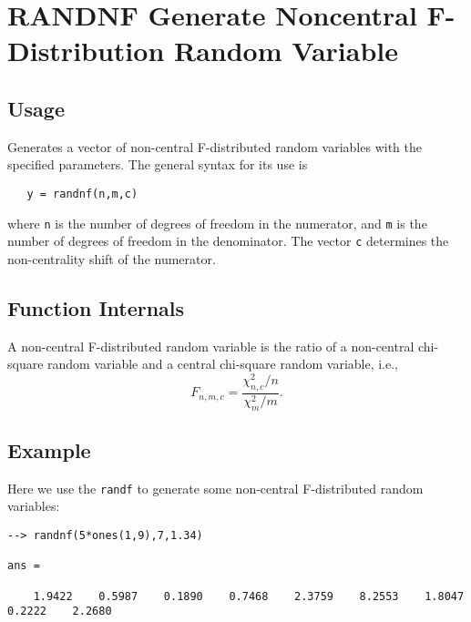 \section{RANDNF Generate Noncentral F-Distribution Random Variable}

\subsection{Usage}

Generates a vector of non-central F-distributed random variables
with the specified parameters.  The general syntax for its use is
\begin{verbatim}
   y = randnf(n,m,c)
\end{verbatim}
where \verb|n| is the number of degrees of freedom in the numerator,
and \verb|m| is the number of degrees of freedom in the denominator.
The vector \verb|c| determines the non-centrality shift of the numerator.
\subsection{Function Internals}

A non-central F-distributed random variable is the ratio of a
non-central chi-square random variable and a central chi-square random
variable, i.e.,
\[
   F_{n,m,c} = \frac{\chi_{n,c}^2/n}{\chi_m^2/m}.
\]
\subsection{Example}

Here we use the \verb|randf| to generate some non-central F-distributed
random variables:
\begin{verbatim}
--> randnf(5*ones(1,9),7,1.34)

ans = 

    1.9422    0.5987    0.1890    0.7468    2.3759    8.2553    1.8047    0.2222    2.2680 
\end{verbatim}

